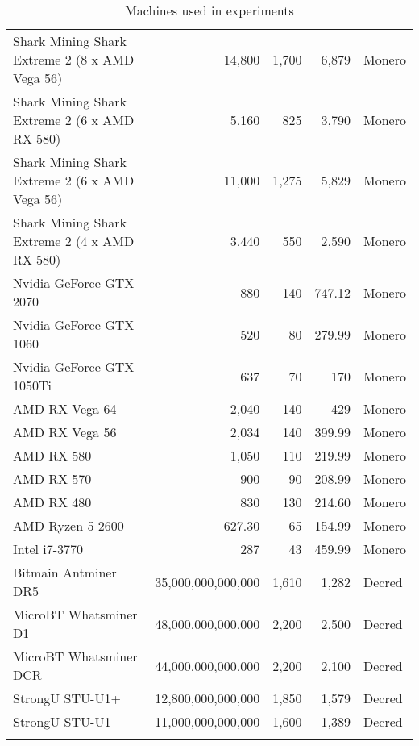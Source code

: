 \begin{longtable}{|p{}|r|r|r|p{}|}
  Shark Mining Shark Extreme 2 (8 x AMD Vega 56) & 14,800 & 1,700 & 6,879 & Monero \\
  Shark Mining Shark Extreme 2 (6 x AMD RX 580) & 5,160 & 825 & 3,790 & Monero \\
  Shark Mining Shark Extreme 2 (6 x AMD Vega 56) & 11,000 & 1,275 & 5,829 & Monero \\
  Shark Mining Shark Extreme 2 (4 x AMD RX 580) & 3,440 & 550 & 2,590 & Monero \\
  Nvidia GeForce GTX 2070 & 880 & 140 & 747.12 & Monero \\
  Nvidia GeForce GTX 1060 & 520 & 80 & 279.99 & Monero \\
  Nvidia GeForce GTX 1050Ti & 637 & 70 & 170 & Monero \\
  AMD RX Vega 64 & 2,040 & 140 & 429 & Monero \\
  AMD RX Vega 56 & 2,034 & 140 & 399.99 & Monero \\
  AMD RX 580 & 1,050 & 110 & 219.99 & Monero \\
  AMD RX 570 & 900 & 90 & 208.99 & Monero \\
  AMD RX 480 & 830 & 130 & 214.60 & Monero \\
  AMD Ryzen 5 2600 & 627.30 & 65 & 154.99 & Monero \\
  Intel i7-3770 & 287 & 43 & 459.99 & Monero \\
  \hline
  Bitmain Antminer DR5 & 35,000,000,000,000 & 1,610 & 1,282 & Decred \\
  MicroBT Whatsminer D1 & 48,000,000,000,000 & 2,200 & 2,500 & Decred \\
  MicroBT Whatsminer DCR & 44,000,000,000,000 & 2,200 & 2,100 & Decred \\
  StrongU STU-U1+ & 12,800,000,000,000 & 1,850 & 1,579 & Decred \\
  StrongU STU-U1 & 11,000,000,000,000 & 1,600 & 1,389 & Decred \\
  \hline
\caption{Machines used in experiments}
\label{tbl:machines}
\end{longtable}
